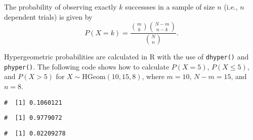 \documentclass[letterpaper,12pt,twoside,]{pinp}
\begin{document}
The probability of observing exactly \(k\) successses in a sample of
size \(n\) (i.e., \(n\) dependent trials) is given by
\[P(X = k) = \dfrac{{m \choose k} {N - m \choose n-k}}{{N \choose n}}. \]

Hypergeometric probabilities are calculated in \textsf{R} with the use
of \texttt{dhyper()} and \texttt{phyper()}. The following code shows how
to calculate \(P(X = 5)\), \(P(X \leq 5)\), and \(P(X > 5)\) for
\(X \sim \text{HGeom}(10, 15, 8)\), where \(m = 10\), \(N - m = 15\),
and \(n = 8\).

\begin{Shaded}
\begin{Highlighting}[]
\NormalTok{(}\NormalTok{, }\NormalTok{, }\NormalTok{, }\NormalTok{)}
\end{Highlighting}
\end{Shaded}

\begin{ShadedResult}
\begin{verbatim}
#  [1] 0.1060121
\end{verbatim}
\end{ShadedResult}

\begin{Shaded}
\begin{Highlighting}[]
\NormalTok{(}\NormalTok{, }\NormalTok{, }\NormalTok{, }\NormalTok{)}
\end{Highlighting}
\end{Shaded}

\begin{ShadedResult}
\begin{verbatim}
#  [1] 0.9779072
\end{verbatim}
\end{ShadedResult}

\begin{Shaded}
\begin{Highlighting}[]
\NormalTok{(}\NormalTok{, }\NormalTok{, }\NormalTok{, }\NormalTok{, } \NormalTok{)}
\end{Highlighting}
\end{Shaded}

\begin{ShadedResult}
\begin{verbatim}
#  [1] 0.02209278
\end{verbatim}
\end{ShadedResult}
\end{document}
